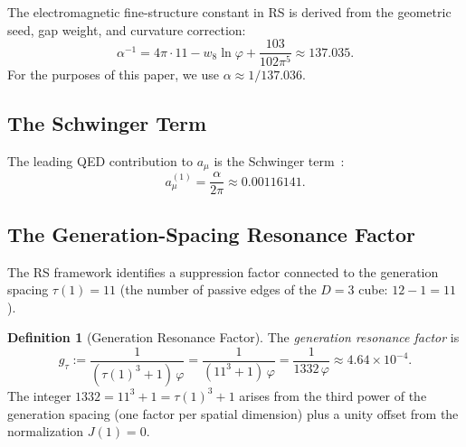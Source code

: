 \documentclass[12pt,a4paper]{article}
\theoremstyle{definition}
\newtheorem{definition}[theorem]{Definition}
\theoremstyle{remark}
\begin{document}
The electromagnetic fine-structure constant in RS is derived from the
geometric seed, gap weight, and curvature correction:
\begin{equation}
  \alpha^{-1} = 4\pi \cdot 11 - w_8 \ln\varphi + \frac{103}{102\pi^5}
  \approx 137.035.
\end{equation}
For the purposes of this paper, we use $\alpha \approx 1/137.036$.

\subsection{The Schwinger Term}

The leading QED contribution to $a_\mu$ is the Schwinger
term~\cite{Schwinger1948}:
\begin{equation}
  a_\mu^{(1)} = \frac{\alpha}{2\pi} \approx 0.00116141.
\end{equation}

\subsection{The Generation-Spacing Resonance Factor}

The RS framework identifies a suppression factor connected to the
generation spacing $\tau(1) = 11$ (the number of passive edges of the
$D = 3$ cube: $12 - 1 = 11$).

\begin{definition}[Generation Resonance Factor]
The \emph{generation resonance factor} is
\begin{equation}
  g_{\tau} := \frac{1}{(\tau(1)^3 + 1)\,\varphi}
  = \frac{1}{(11^3 + 1)\,\varphi}
  = \frac{1}{1332\,\varphi} \approx 4.64 \times 10^{-4}.
\end{equation}
The integer $1332 = 11^3 + 1 = \tau(1)^3 + 1$ arises from the
third power of the generation spacing (one factor per spatial
dimension) plus a unity offset from the normalization $J(1) = 0$.
\end{definition}
\end{document}
